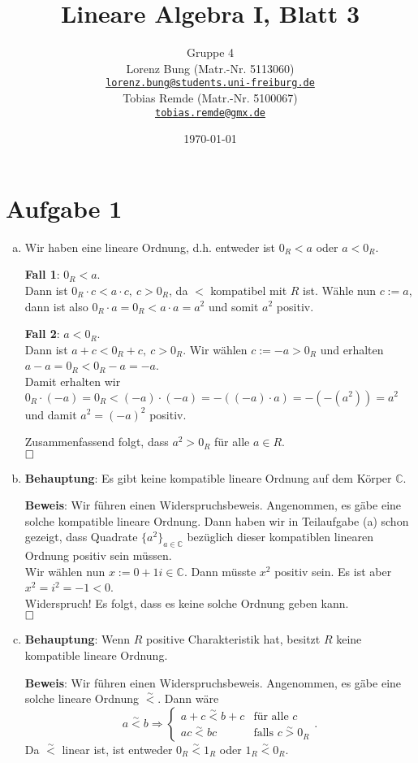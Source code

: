 \documentclass[12pt,a4paper]{article}
\title{Lineare Algebra I, Blatt 3}
\author{Gruppe 4\\
    Lorenz Bung (Matr.-Nr. 5113060)\\
    \href{mailto:lorenz.bung@students.uni-freiburg.de}{\texttt{lorenz.bung@students.uni-freiburg.de}}\\
    Tobias Remde (Matr.-Nr. 5100067)\\
    \href{mailto:tobias.remde@gmx.de}{\texttt{tobias.remde@gmx.de}}
}
\date{\today}
\newcommand{\qed}{\null\nobreak\hfill\square}
\begin{document}
\maketitle


\section*{Aufgabe 1}

\begin{enumerate}[(a)]
    \item Wir haben eine lineare Ordnung, d.h. entweder ist $0_R < a$ oder $a < 0_R$.

    \textbf{Fall 1}: $0_R < a$.\\
    Dann ist $0_R \cdot c < a \cdot c,\ c > 0_R$, da $<$ kompatibel mit $R$ ist.
    Wähle nun $c := a$, dann ist also $0_R \cdot a = 0_R < a \cdot a = a^2$ und somit $a^2$ positiv.

    \textbf{Fall 2}: $a < 0_R$.\\
    Dann ist $a + c < 0_R + c,\ c > 0_R$.
    Wir wählen $c := -a > 0_R$ und erhalten $a - a  = 0_R < 0_R -a = -a$.\\
    Damit erhalten wir $0_R \cdot (-a) = 0_R < (-a) \cdot (-a) = -((-a) \cdot a) = -(-(a^2)) = a^2$ und damit $a^2 = (-a)^2$ positiv.

    Zusammenfassend folgt, dass $a^2 > 0_R$ für alle $a \in R$.\\
    $\qed$

    \item \textbf{Behauptung}: Es gibt keine kompatible lineare Ordnung auf dem Körper $\mathbb{C}$.

    \textbf{Beweis}:
    Wir führen einen Widerspruchsbeweis.
    Angenommen, es gäbe eine solche kompatible lineare Ordnung.
    Dann haben wir in Teilaufgabe (a) schon gezeigt, dass Quadrate $\{a^2\}_{a \in \mathbb{C}}$ bezüglich dieser kompatiblen linearen Ordnung positiv sein müssen.\\
    Wir wählen nun $x := 0+1i \in \mathbb{C}$.
    Dann müsste $x^2$ positiv sein.
    Es ist aber $x^2 = i^2 = -1 < 0$.\\
    Widerspruch!
    Es folgt, dass es keine solche Ordnung geben kann.\\
    $\qed$

    \item \textbf{Behauptung}: Wenn $R$ positive Charakteristik hat, besitzt $R$ keine kompatible lineare Ordnung.

    \textbf{Beweis}:
    Wir führen einen Widerspruchsbeweis.
    Angenommen, es gäbe eine solche lineare Ordnung $\overset{\sim}{<}$.
    Dann wäre
    $$a \overset{\sim}{<} b \Rightarrow \left\{ \begin{array}{ll}a+c\overset{\sim}{<} b+c &\text{für alle }c\\ ac \overset{\sim}{<} bc &\text{falls } c \overset{\sim}{>} 0_R\end{array}\right..$$
    Da $\overset{\sim}{<}$ linear ist, ist entweder $0_R \overset{\sim}{<} 1_R$ oder $1_R \overset{\sim}{<} 0_R$.


\end{enumerate}
\end{document}
